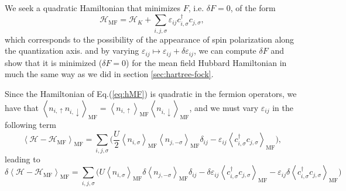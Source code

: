We seek a quadratic Hamiltonian that minimizes $F$, i.e. $\delta F = 0$, of the form
\begin{equation}\label{eq:hMF}
\mathcal{H}_{\text{MF}} = \mathcal{H}_K + \sum_{i, j, \sigma} \varepsilon_{ij} c_{i, \sigma}^\dagger c_{j, \sigma} ,
\end{equation}
which corresponds to the possibility of the  appearance of spin polarization along the quantization axis.
and by varying $\varepsilon_{ij} \mapsto \varepsilon_{ij} + \delta \varepsilon_{ij} $, we can compute $\delta F$ and show that it is minimized ($\delta F = 0$) for the mean field Hubbard Hamiltonian in much the same way as we did in section \ref{sec:hartree-fock}.

Since the Hamiltonian of Eq.(\ref{eq:hMF}) is quadratic in the fermion operators, we have that $ \left\langle n_{i,\uparrow} n_{i,\downarrow} \right\rangle_{\text{MF}} = \left\langle n_{i,\uparrow} \right\rangle_{\text{MF}} \left\langle n_{i,\downarrow} \right\rangle_{\text{MF}}$, and we must vary $\varepsilon_{ij}$ in the following term
\begin{equation}
\left\langle \mathcal{H} - \mathcal{H}_{\text{MF}} \right\rangle_{\text{MF}} = \sum_{i, j, \sigma} \bigg( \frac{U}{2} \left\langle n_{i,\sigma} \right\rangle_{\text{MF}} \left\langle n_{j,-\sigma} \right\rangle_{\text{MF}} \delta_{ij} -\varepsilon_{ij} \left\langle c_{i,\sigma}^\dagger c_{j, \sigma} \right\rangle_{\text{MF}} \bigg),
\end{equation}
leading to
\begin{equation}
\delta \left\langle \mathcal{H} - \mathcal{H}_{\text{MF}} \right\rangle_{\text{MF}} = \sum_{i, j, \sigma} \bigg( U \left\langle n_{i,\sigma} \right\rangle_{\text{MF}} \delta \left\langle n_{j,-\sigma} \right\rangle_{\text{MF}} \delta_{ij} - \delta \varepsilon_{ij} \left\langle c_{i,\sigma}^\dagger c_{j, \sigma} \right\rangle_{\text{MF}} - \varepsilon_{ij} \delta \left\langle c_{i,\sigma}^\dagger c_{j, \sigma} \right\rangle_{\text{MF}} \bigg)
\end{equation}

